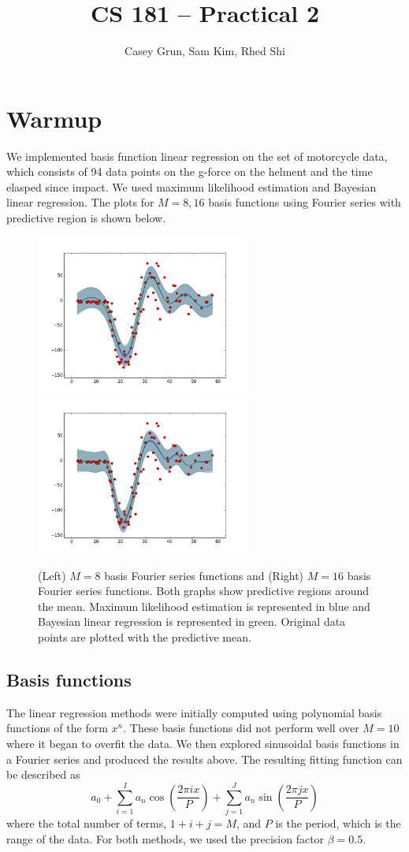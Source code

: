 \documentclass[11pt]{amsart}
\title{CS 181 -- Practical 2}
\author{Casey Grun, Sam Kim, Rhed Shi}
\begin{document}
\maketitle

\section{Warmup}

We implemented basis function linear regression on the set of motorcycle data, which consists of 94 data points on the g-force on the helment and the time elasped since impact. We used maximum likelihood estimation and Bayesian linear regression. The plots for $M = 8, 16$ basis functions using Fourier series with predictive region is shown below. 

\begin{figure}[h]
	\centering
	\includegraphics[width=7cm]{warmup_fourier_8}
	\includegraphics[width=7cm]{warmup_fourier_16}\\
	\caption{(Left) $M = 8$ basis Fourier series functions and (Right) $M = 16$ basis Fourier series functions. Both graphs show predictive regions around the mean. Maximum likelihood estimation is represented in blue and Bayesian linear regression is represented in green. Original data points are plotted with the predictive mean.}
\end{figure}

\subsection{Basis functions}
The linear regression methods were initially computed using polynomial basis functions of the form $x^n$. These basis functions did not perform well over $M = 10$ where it began to overfit the data. We then explored sinusoidal basis functions in a Fourier series and produced the results above. The resulting fitting function can be described as
 $$a_0+\sum_{i=1}^Ia_n\cos(\frac{2\pi ix}{P})+\sum_{j=1}^Ja_n\sin(\frac{2\pi jx}{P})$$
where the total number of terms, $1+i+j=M$, and $P$ is the period, which is the range of the data. For both methods, we used the precision factor $\beta = 0.5$. 
\end{document}
